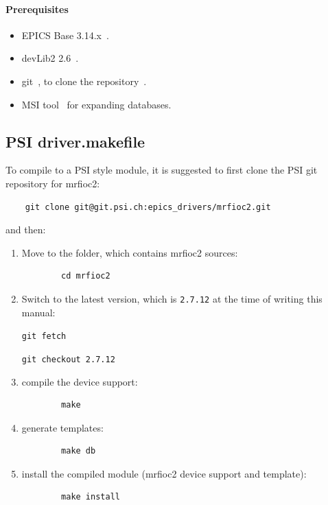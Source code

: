 \documentclass[12pt,a4paper]{article}
\newcommand{\latestDriverVersion}{2.7.12}
\begin{document}
\paragraph{Prerequisites}
\begin{itemize}
\item 
	EPICS Base 3.14.x~\cite{epics}.
\item 
	devLib2 2.6~\cite{devlib2}.
\item
	git~\cite{git}, to clone the repository~\cite{git_mrfioc2}.
\item 
	MSI tool~\cite{msi} for expanding databases.
\end{itemize}

\subsection{PSI driver.makefile}\label{sec:PSI driver.makefile}
To compile to a PSI style module, it is suggested to first clone the PSI git repository for mrfioc2:
\begin{verbatim}
	git clone git@git.psi.ch:epics_drivers/mrfioc2.git
\end{verbatim}
and then:
\begin{enumerate}
\item
	Move to the folder, which contains mrfioc2 sources:
	\begin{verbatim}
		cd mrfioc2
	\end{verbatim}
	
\item 
	Switch to the latest version, which is \texttt{\latestDriverVersion} at the time of writing this manual:
	
	\texttt{git fetch}
	
	\texttt{git checkout \latestDriverVersion}
	
\item
	compile the device support:
	\begin{verbatim}
		make
	\end{verbatim}

\item 
	generate templates:
	\begin{verbatim}
		make db
	\end{verbatim}

\item 
	install the compiled module (mrfioc2 device support and template):
	\begin{verbatim}
		make install
	\end{verbatim}
\end{enumerate}
\end{document}
